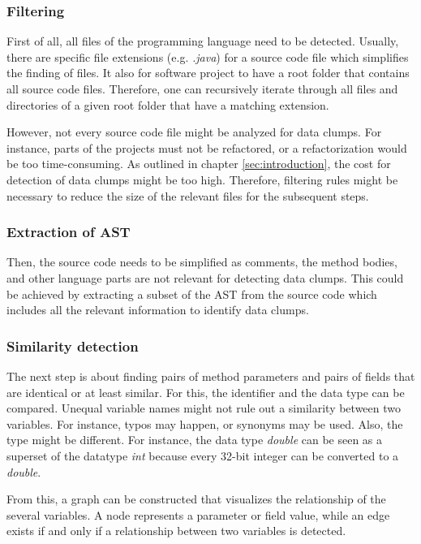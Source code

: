 \subsubsection{Filtering}\label{subsub:filtering_files}
First of all, all files of the programming language need to be detected. Usually, there are specific file extensions (e.g. \textit{.java}) for a source code file which simplifies the finding of files. It also for software project to have a root folder that contains all source code files. Therefore, one can recursively iterate through all files and directories of a given root folder that have a matching extension. 

However, not every source code file might be analyzed for data clumps. For instance, parts of the projects must not be refactored, or a refactorization would be too time-consuming. As outlined in chapter \ref{sec:introduction}, the cost for detection of data clumps might be too high. Therefore, filtering rules might be necessary to reduce the size of the relevant files for the subsequent steps.  

\subsubsection{Extraction of AST}
Then,  the source code needs to be simplified as comments, the method bodies, and other language parts are not relevant for detecting data clumps. This could be achieved by extracting a subset of the \ac{AST} from the source code which includes all the relevant information to identify data clumps.
\subsubsection{Similarity detection}

The next step is about finding pairs of method parameters and pairs of fields that are identical or at least similar. For this, the identifier and the  data type can be compared. Unequal variable names might not rule out a similarity between two variables. For instance, typos may happen, or synonyms may be used. Also, the type might be different. For instance, the data type \textit{double} can be seen as a superset of the datatype \textit{int} because every 32-bit integer can be converted to a \textit{double}.

From this, a graph can be constructed that visualizes the relationship of the several variables. A node represents a parameter or field value, while an edge exists if and only if a relationship between two variables is detected. 


